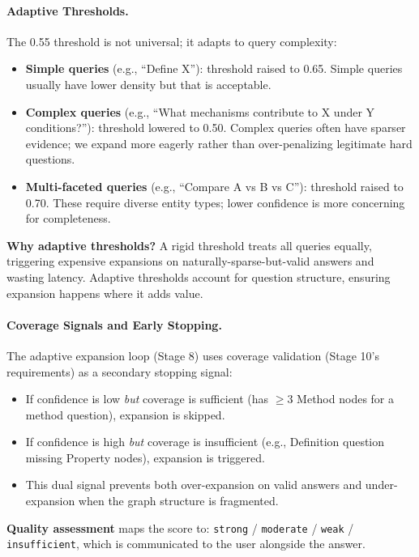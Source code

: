 \documentclass[11pt]{article}
\begin{document}
\paragraph{Adaptive Thresholds.} The 0.55 threshold is not universal; it adapts to query complexity:

\begin{itemize}[leftmargin=1.2em]
  \item \textbf{Simple queries} (e.g., ``Define X''): threshold raised to 0.65. Simple queries usually have lower density but that is acceptable.
  \item \textbf{Complex queries} (e.g., ``What mechanisms contribute to X under Y conditions?''): threshold lowered to 0.50. Complex queries often have sparser evidence; we expand more eagerly rather than over-penalizing legitimate hard questions.
  \item \textbf{Multi-faceted queries} (e.g., ``Compare A vs B vs C''): threshold raised to 0.70. These require diverse entity types; lower confidence is more concerning for completeness.
\end{itemize}

\textbf{Why adaptive thresholds?} A rigid threshold treats all queries equally, triggering expensive expansions on naturally-sparse-but-valid answers and wasting latency. Adaptive thresholds account for question structure, ensuring expansion happens where it adds value.

\paragraph{Coverage Signals and Early Stopping.} The adaptive expansion loop (Stage 8) uses coverage validation (Stage 10's requirements) as a secondary stopping signal:

\begin{itemize}[leftmargin=1.2em]
  \item If confidence is low \emph{but} coverage is sufficient (has $\geq$3 Method nodes for a method question), expansion is skipped.
  \item If confidence is high \emph{but} coverage is insufficient (e.g., Definition question missing Property nodes), expansion is triggered.
  \item This dual signal prevents both over-expansion on valid answers and under-expansion when the graph structure is fragmented.
\end{itemize}

\textbf{Quality assessment} maps the score to: \texttt{strong} / \texttt{moderate} / \texttt{weak} / \texttt{insufficient}, which is communicated to the user alongside the answer.
\end{document}
